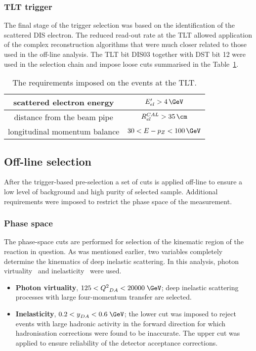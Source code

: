 \subsubsection{TLT trigger}
\label{subsubsec:tltcuts}
The final stage of the trigger selection was based on the identification of the scattered DIS electron. The reduced read-out rate at the TLT allowed application of the complex reconstruction algorithms that were much closer related to those used in the off-line analysis. The TLT bit \textsf{DIS03} together with DST bit 12 were used in the selection chain and impose loose cuts summarised in the Table~\ref{tab:TLTDSTreq}.
\begin{table}
\centering
\begin{tabular}{|c|c|}
\hline scattered electron energy & $E'_{el}>4\,\GeV$ \\ 
\hline distance from the beam pipe  & $R_{el}^{CAL}>35\,\cm$ \\ 
\hline longitudinal momentum balance & $30<E-p_Z<100\,\GeV$\\
\hline 
\end{tabular} 
\caption{The requirements imposed on the events at the TLT.}
\label{tab:TLTDSTreq}
\end{table}

\subsection{Off-line selection}
\label{subsec:offlineselect}

After the trigger-based pre-selection a set of cuts is applied off-line to ensure a low level of background and high purity of selected sample. Additional requirements were imposed to restrict the phase space of the measurement. 

\subsubsection{Phase space}
\label{subsubsec:phasespace}
The phase-space cuts are performed for selection of the kinematic region of the reaction in question. As was mentioned earlier, two variables completely determine the kinematics of deep inelastic scattering. In this analysis, photon virtuality \qsq~and inelasticity \y~were used.
\begin{itemize}
	\item \textbf{Photon virtuality}, $125 < \qsq_{DA} < 20000\;\GeV$;  deep inelastic scattering processes with large four-momentum transfer are selected.
	\item \textbf{Inelasticity}, $0.2 < \y_{DA} < 0.6\;\GeV$; the lower cut was imposed to reject events with large hadronic activity in the forward direction for which hadronisation corrections were found to be inaccurate. The upper cut was applied to ensure reliability of the detector acceptance corrections.
\end{itemize}

